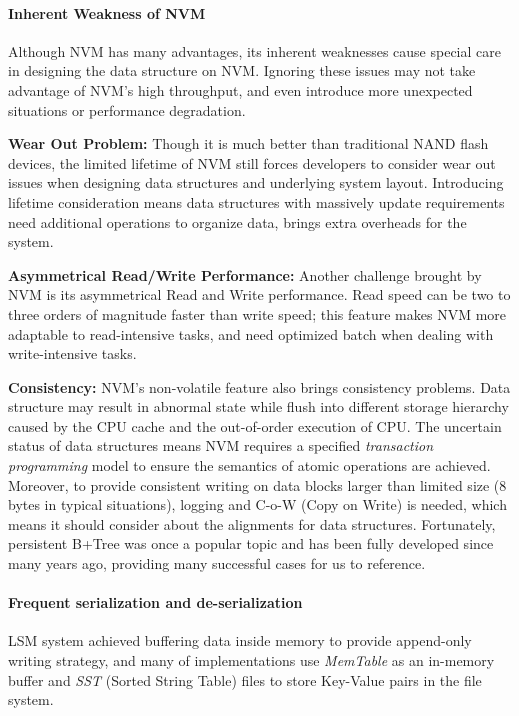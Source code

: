 \paragraph{Inherent Weakness of NVM}
Although NVM has many advantages, its inherent weaknesses cause special care in designing the data structure on NVM. Ignoring these issues may not take advantage of NVM's high throughput, and even introduce more unexpected situations or performance degradation.

\textbf{Wear Out Problem:} Though it is much better than traditional NAND flash devices, the limited lifetime of NVM still forces developers to consider wear out issues when designing data structures and underlying system layout\cite{dulloor2014system,van2018managing}. Introducing lifetime consideration means data structures with massively update requirements need additional operations to organize data, brings extra overheads for the system. 

\textbf{Asymmetrical Read/Write Performance:} Another challenge brought by NVM is its asymmetrical Read and Write performance\cite{wu2017early}. Read speed can be two to three orders of magnitude faster than write speed; this feature makes NVM more adaptable to read-intensive tasks, and need optimized batch when dealing with write-intensive tasks.


\textbf{Consistency:}\label{sec:8bytes-law} NVM's non-volatile feature also brings consistency problems. Data structure may result in abnormal state while flush into different storage hierarchy caused by the CPU cache and the out-of-order execution of CPU. The uncertain status of data structures means NVM requires a specified \textit{transaction programming} model\cite{volos2011mnemosyne,dulloor2014system,ren2015thynvm,188438} to ensure the semantics of atomic operations are achieved. Moreover, to provide consistent writing on data blocks larger than limited size (8 bytes in typical situations), logging and C-o-W (Copy on Write) is needed, which means it should consider about the alignments for data structures. Fortunately, persistent B+Tree\cite{188438,oukid2016fptree} was once a popular topic and has been fully developed since many years ago, providing many successful cases for us to reference.

\paragraph{Frequent serialization and de-serialization} LSM system achieved buffering data inside memory to provide append-only writing strategy, and many of implementations use \textit{MemTable} as an in-memory buffer and \textit{SST} (Sorted String Table) files to store Key-Value pairs in the file system. 

